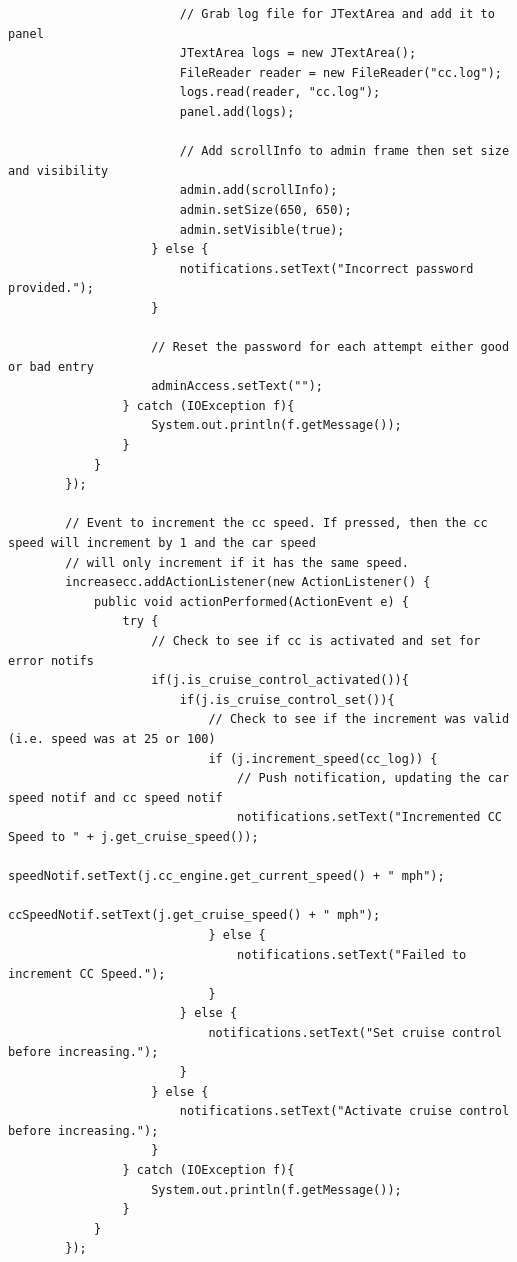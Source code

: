 \documentclass[preprint,11pt,3p]{article}
\begin{document}
\begin{lstlisting}
                        // Grab log file for JTextArea and add it to panel
                        JTextArea logs = new JTextArea(); 
                        FileReader reader = new FileReader("cc.log");
                        logs.read(reader, "cc.log");
                        panel.add(logs);

                        // Add scrollInfo to admin frame then set size and visibility
                        admin.add(scrollInfo);
                        admin.setSize(650, 650);
                        admin.setVisible(true);
                    } else { 
                        notifications.setText("Incorrect password provided.");
                    }
                    
                    // Reset the password for each attempt either good or bad entry
                    adminAccess.setText("");
                } catch (IOException f){ 
                    System.out.println(f.getMessage());
                }
            }
        });

        // Event to increment the cc speed. If pressed, then the cc speed will increment by 1 and the car speed
        // will only increment if it has the same speed.
        increasecc.addActionListener(new ActionListener() {
            public void actionPerformed(ActionEvent e) {
                try {
                	// Check to see if cc is activated and set for error notifs
                    if(j.is_cruise_control_activated()){ 
                        if(j.is_cruise_control_set()){ 
                        	// Check to see if the increment was valid (i.e. speed was at 25 or 100)
                        	if (j.increment_speed(cc_log)) {
                        		// Push notification, updating the car speed notif and cc speed notif
                            	notifications.setText("Incremented CC Speed to " + j.get_cruise_speed());
                            	speedNotif.setText(j.cc_engine.get_current_speed() + " mph");
                            	ccSpeedNotif.setText(j.get_cruise_speed() + " mph");
                        	} else {
                        		notifications.setText("Failed to increment CC Speed.");
                        	}
                        } else { 
                            notifications.setText("Set cruise control before increasing.");
                        }
                    } else { 
                        notifications.setText("Activate cruise control before increasing.");
                    }
                } catch (IOException f){
                    System.out.println(f.getMessage());
                }
            }
        });


\end{lstlisting}
\end{document}
